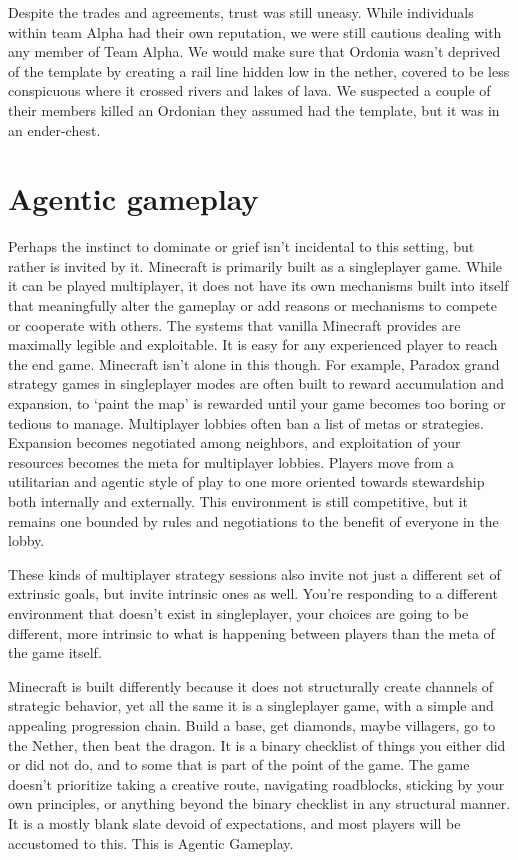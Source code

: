Despite the trades and agreements, trust was still uneasy. While individuals within team Alpha had their own reputation, we were still cautious dealing with any member of Team Alpha. We would make sure that Ordonia wasn't deprived of the template by creating a rail line hidden low in the nether, covered to be less conspicuous where it crossed rivers and lakes of lava. We suspected a couple of their members killed an Ordonian they assumed had the template, but it was in an ender-chest.

\section{Agentic gameplay}
Perhaps the instinct to dominate or grief isn't incidental to this setting, but rather is invited by it. Minecraft is primarily built as a singleplayer game. While it can be played multiplayer, it does not have its own mechanisms built into itself that meaningfully alter the gameplay or add reasons or mechanisms to compete or cooperate with others. The systems that vanilla Minecraft provides are maximally legible and exploitable. It is easy for any experienced player to reach the end game. Minecraft isn't alone in this though. For example, Paradox grand strategy games in singleplayer modes are often built to reward accumulation and expansion, to `paint the map' is rewarded until your game becomes too boring or tedious to manage. Multiplayer lobbies often ban a list of metas or strategies. Expansion becomes negotiated among neighbors, and exploitation of your resources becomes the meta for multiplayer lobbies. Players move from a utilitarian and agentic style of play to one more oriented towards stewardship both internally and externally. This environment is still competitive, but it remains one bounded by rules and negotiations to the benefit of everyone in the lobby.

These kinds of multiplayer strategy sessions also invite not just a different set of extrinsic goals, but invite intrinsic ones as well. You're responding to a different environment that doesn't exist in singleplayer, your choices are going to be different, more intrinsic to what is happening between players than the meta of the game itself.

Minecraft is built differently because it does not structurally create channels of strategic behavior, yet all the same it is a singleplayer game, with a simple and appealing progression chain. Build a base, get diamonds, maybe villagers, go to the Nether, then beat the dragon. It is a binary checklist of things you either did or did not do, and to some that is part of the point of the game. The game doesn't prioritize taking a creative route, navigating roadblocks, sticking by your own principles, or anything beyond the binary checklist in any structural manner. It is a mostly blank slate devoid of expectations, and most players will be accustomed to this. This is Agentic Gameplay.

